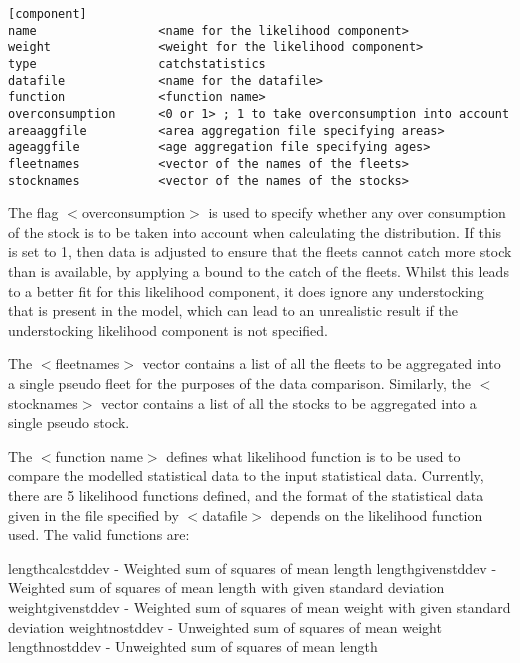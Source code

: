 \documentclass [a4paper, 10pt]{book}
\begin{document}
{\small\begin{verbatim}
[component]
name                 <name for the likelihood component>
weight               <weight for the likelihood component>
type                 catchstatistics
datafile             <name for the datafile>
function             <function name>
overconsumption      <0 or 1> ; 1 to take overconsumption into account
areaaggfile          <area aggregation file specifying areas>
ageaggfile           <age aggregation file specifying ages>
fleetnames           <vector of the names of the fleets>
stocknames           <vector of the names of the stocks>
\end{verbatim}}

The flag $<$overconsumption$>$ is used to specify whether any over consumption of the stock is to be taken into account when calculating the distribution.  If this is set to 1, then data is adjusted to ensure that the fleets cannot catch more stock than is available, by applying a bound to the catch of the fleets.  Whilst this leads to a better fit for this likelihood component, it does ignore any understocking that is present in the model, which can lead to an unrealistic result if the understocking likelihood component is not specified.

\bigskip
The $<$fleetnames$>$ vector contains a list of all the fleets to be aggregated into a single pseudo fleet for the purposes of the data comparison.  Similarly, the $<$stocknames$>$ vector contains a list of all the stocks to be aggregated into a single pseudo stock.

\bigskip
The $<$function name$>$ defines what likelihood function is to be used to compare the modelled statistical data to the input statistical data.  Currently, there are 5 likelihood functions defined, and the format of the statistical data given in the file specified by $<$datafile$>$ depends on the likelihood function used.  The valid functions are:

\bigskip
lengthcalcstddev - Weighted sum of squares of mean length\newline
lengthgivenstddev - Weighted sum of squares of mean length with given standard deviation\newline
weightgivenstddev - Weighted sum of squares of mean weight with given standard deviation\newline
weightnostddev - Unweighted sum of squares of mean weight\newline
lengthnostddev - Unweighted sum of squares of mean length
\end{document}
